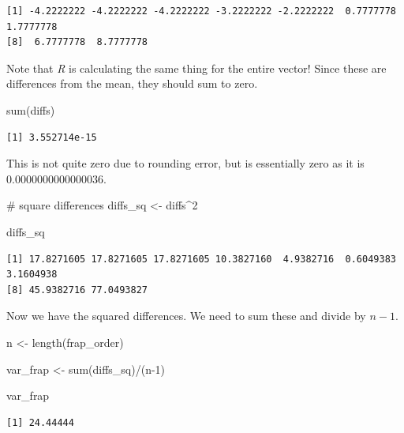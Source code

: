 \documentclass[
  letterpaper,
  DIV=11,
  numbers=noendperiod]{scrreprt}
\newenvironment{Shaded}{\begin{snugshade}}{\end{snugshade}}
\newcommand{\CommentTok}[1]{\textcolor[rgb]{0.37,0.37,0.37}{#1}}
\newcommand{\DecValTok}[1]{\textcolor[rgb]{0.68,0.00,0.00}{#1}}
\newcommand{\FunctionTok}[1]{\textcolor[rgb]{0.28,0.35,0.67}{#1}}
\newcommand{\NormalTok}[1]{\textcolor[rgb]{0.00,0.23,0.31}{#1}}
\newcommand{\OtherTok}[1]{\textcolor[rgb]{0.00,0.23,0.31}{#1}}
\newcommand{\SpecialCharTok}[1]{\textcolor[rgb]{0.37,0.37,0.37}{#1}}
\begin{document}
\begin{verbatim}
[1] -4.2222222 -4.2222222 -4.2222222 -3.2222222 -2.2222222  0.7777778  1.7777778
[8]  6.7777778  8.7777778
\end{verbatim}

Note that \emph{R} is calculating the same thing for the entire vector!
Since these are differences from the mean, they should sum to zero.

\begin{Shaded}
\begin{Highlighting}[]
\FunctionTok{sum}\NormalTok{(diffs)}
\end{Highlighting}
\end{Shaded}

\begin{verbatim}
[1] 3.552714e-15
\end{verbatim}

This is not quite zero due to rounding error, but is essentially zero as
it is 0.0000000000000036.

\begin{Shaded}
\begin{Highlighting}[]
\CommentTok{\# square differences}
\NormalTok{diffs\_sq }\OtherTok{\textless{}{-}}\NormalTok{ diffs}\SpecialCharTok{\^{}}\DecValTok{2}

\NormalTok{diffs\_sq}
\end{Highlighting}
\end{Shaded}

\begin{verbatim}
[1] 17.8271605 17.8271605 17.8271605 10.3827160  4.9382716  0.6049383  3.1604938
[8] 45.9382716 77.0493827
\end{verbatim}

Now we have the squared differences. We need to sum these and divide by
\(n-1\).

\begin{Shaded}
\begin{Highlighting}[]
\NormalTok{n }\OtherTok{\textless{}{-}} \FunctionTok{length}\NormalTok{(frap\_order)}

\NormalTok{var\_frap }\OtherTok{\textless{}{-}} \FunctionTok{sum}\NormalTok{(diffs\_sq)}\SpecialCharTok{/}\NormalTok{(n}\DecValTok{{-}1}\NormalTok{)}

\NormalTok{var\_frap}
\end{Highlighting}
\end{Shaded}

\begin{verbatim}
[1] 24.44444
\end{verbatim}
\end{document}

